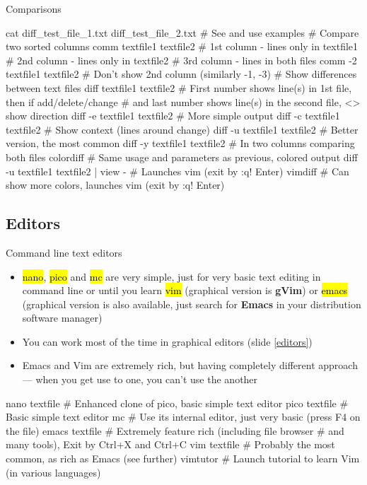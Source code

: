 \documentclass[compress, ucs, xelatex, 11pt, xcolor=svgnames,
  hyperref={
    bookmarks=true,
    unicode=true,
    colorlinks=true,
    pdftitle={Linux, command line and MetaCentrum},
    plainpages=false,
    pdfauthor={Vojtech Zeisek},
    pdfsubject={Course about use of Linux command line, writing shell scripts and using MetaCentrum of CESNET},
    pdfcreator={XeLaTeX},
    pdfkeywords={Linux, GNU, BASH, shell, command line, MetaCentrum},
    linkcolor=DarkRed,
    anchorcolor=DarkBlue,
    citecolor=Indigo,
    filecolor=NavyBlue,
    menucolor=DarkMagenta,
    urlcolor=DarkBlue,
    pdftex},
  url={hyphens, lowtilde} %
  ]{beamer}
\renewcommand{\texttt}[1]{\hl{\ttfamily #1}}
\begin{document}
\begin{frame}[fragile]{Comparisons}
  \begin{bashcode}
    cat diff_test_file_1.txt diff_test_file_2.txt # See and use examples
    # Compare two sorted columns
    comm textfile1 textfile2
      # 1st column - lines only in textfile1
      # 2nd column - lines only in textfile2
      # 3rd column - lines in both files
    comm -2 textfile1 textfile2 # Don't show 2nd column (similarly -1, -3)
    # Show differences between text files
    diff textfile1 textfile2
      # First number shows line(s) in 1st file, then if add/delete/change
      # and last number shows line(s) in the second file, <> show direction
    diff -e textfile1 textfile2 # More simple output
    diff -c textfile1 textfile2 # Show context (lines around change)
    diff -u textfile1 textfile2 # Better version, the most common
    diff -y textfile1 textfile2 # In two columns comparing both files
    colordiff # Same usage and parameters as previous, colored output
    diff -u textfile1 textfile2 | view - # Launches vim (exit by :q! Enter)
    vimdiff # Can show more colors, launches vim (exit by :q! Enter)
  \end{bashcode}
\end{frame}

\subsection{Editors} 

\begin{frame}[fragile]{Command line text editors}
  \begin{itemize}
    \item \texttt{nano}, \texttt{pico} and \texttt{mc} are very simple, just for very basic text editing in command line or until you learn \texttt{vim} (graphical version is \textbf{gVim}) or \texttt{emacs} (graphical version is also available, just search for \textbf{Emacs} in your distribution software manager)
    \item You can work most of the time in graphical editors (slide \ref{editors})
    \item Emacs and Vim are extremely rich, but having completely different approach --- when you get use to one, you can't use the another
  \end{itemize}
  \begin{bashcode}
    nano textfile # Enhanced clone of pico, basic simple text editor
    pico textfile # Basic simple text editor
    mc # Use its internal editor, just very basic (press F4 on the file)
    emacs textfile # Extremely feature rich (including file browser
                   # and many tools), Exit by Ctrl+X and Ctrl+C
    vim textfile # Probably the most common, as rich as Emacs (see further)
    vimtutor # Launch tutorial to learn Vim (in various languages)
   \end{bashcode}
\end{frame}
\end{document}
